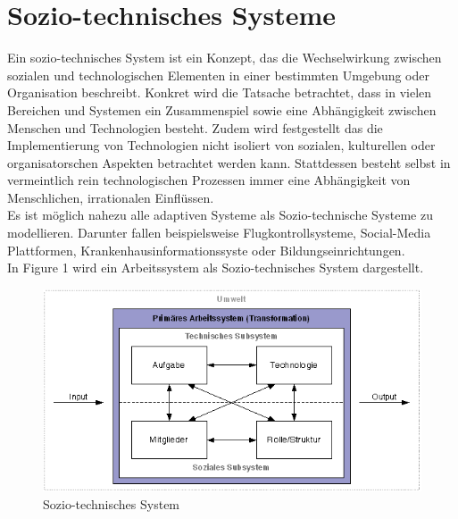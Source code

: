 \documentclass[journal=tosc,final]{iacrtrans}
\begin{document}
\section{Sozio-technisches Systeme}
Ein sozio-technisches System ist ein Konzept, das die Wechselwirkung zwischen sozialen und technologischen Elementen in einer bestimmten Umgebung oder Organisation beschreibt. Konkret wird die Tatsache betrachtet, dass in vielen Bereichen und Systemen ein Zusammenspiel sowie eine Abhängigkeit zwischen Menschen und Technologien besteht. Zudem wird festgestellt das die Implementierung von Technologien nicht isoliert von sozialen, kulturellen oder organisatorschen Aspekten betrachtet werden kann. Stattdessen besteht selbst in vermeintlich rein technologischen Prozessen immer eine Abhängigkeit von Menschlichen, irrationalen Einflüssen.\\
Es ist möglich nahezu alle adaptiven Systeme als Sozio-technische Systeme zu modellieren. Darunter fallen beispielsweise Flugkontrollsysteme, Social-Media Plattformen, Krankenhausinformationssyste oder Bildungseinrichtungen.\\
In Figure 1 wird ein Arbeitssystem als Sozio-technisches System dargestellt.
\begin{figure}[h]
\caption{Sozio-technisches System}
\begin{center}
 \includegraphics[scale=0.5]{sozio.png}
\end{center}
\end{figure}
\end{document}
